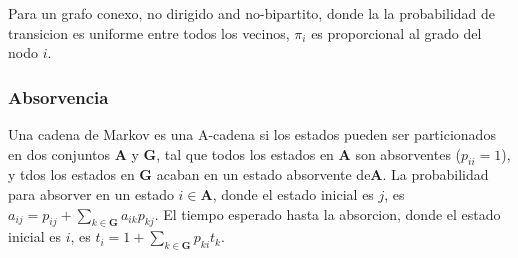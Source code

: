 Para un grafo conexo, no dirigido and no-bipartito, donde la la probabilidad de transicion es uniforme entre todos los vecinos, $\pi_i$ es proporcional al grado del nodo $i$.


\subsubsection{Absorvencia}
Una cadena de Markov es una A-cadena si los estados pueden ser particionados en dos conjuntos $\mathbf{A}$ y $\mathbf{G}$, tal que todos los estados en $\mathbf{A}$ son absorventes ($p_{ii}=1$), y tdos los estados en $\mathbf{G}$ acaban en un estado absorvente de$\mathbf{A}$.
La probabilidad para absorver en un estado $i\in\mathbf{A}$, donde el estado inicial es $j$, es $a_{ij} = p_{ij}+\sum_{k\in\mathbf{G}} a_{ik}p_{kj}$.
El tiempo esperado hasta la absorcion, donde el estado inicial es $i$, es $t_i = 1+\sum_{k\in\mathbf{G}}p_{ki}t_k$.
